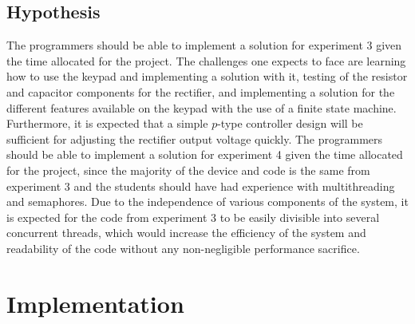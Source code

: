 \documentclass[12pt]{report}
\begin{document}
\subsection{Hypothesis}
The programmers should be able to implement a solution for experiment 3 given the time allocated for
the project. The challenges one expects to face are learning how to use the keypad and implementing
a solution with it, testing of the resistor and capacitor components for the rectifier, and
implementing a solution for the different features available on the keypad with the use of a finite
state machine. Furthermore, it is expected that a simple $p$-type controller design will be
sufficient for adjusting the rectifier output voltage quickly. The programmers should be able to
implement a solution for experiment 4 given the time allocated for the project, since the majority
of the device and code is the same from experiment 3 and the students should have had experience
with multithreading and semaphores. Due to the independence of various components of the system, it
is expected for the code from experiment 3 to be easily divisible into several concurrent threads,
which would increase the efficiency of the system and readability of the code without any
non-negligible performance sacrifice.

\section{Implementation}
\end{document}
